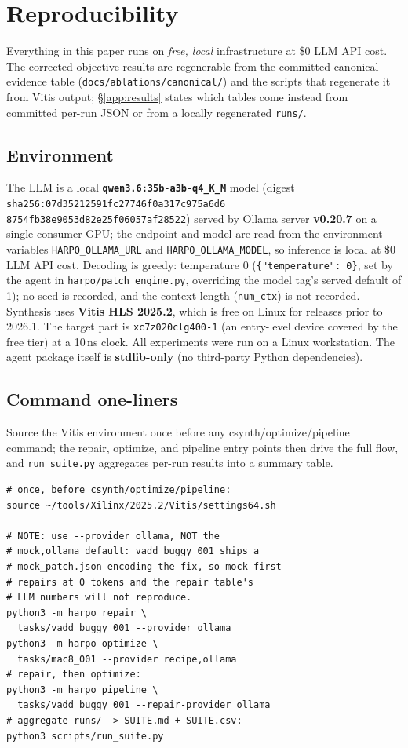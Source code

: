 \section{Reproducibility}\label{app:repro}

Everything in this paper runs on \emph{free, local} infrastructure at \$0 LLM
API cost. The corrected-objective results are regenerable from the committed
canonical evidence table (\texttt{docs/ablations/canonical/}) and the scripts
that regenerate it from Vitis output; \S\ref{app:results} states which tables
come instead from committed per-run JSON or from a locally regenerated
\texttt{runs/}.

\subsection{Environment}

The LLM is a local \textbf{\texttt{qwen3.6:35b-a3b-q4\_K\_M}} model (digest
\texttt{sha256:07d35212591fc277\allowbreak46f0a317c975a6d6\allowbreak%
8754fb38e9053d82\allowbreak e25f06057af28522})
served by Ollama server \textbf{v0.20.7} on a single consumer GPU; the
endpoint and model are read from the environment variables
\texttt{HARPO\_OLLAMA\_URL} and \texttt{HARPO\_OLLAMA\_MODEL}, so inference is
local at \$0 LLM API cost. Decoding is greedy: temperature 0
(\texttt{\{"temperature": 0\}}, set by the agent in
\texttt{harpo/patch\_engine.py}, overriding the model tag's served default of
1); no seed is recorded, and the context length (\texttt{num\_ctx}) is not
recorded. Synthesis uses \textbf{Vitis HLS 2025.2}, which is free on
Linux for releases prior to 2026.1. The target part is
\texttt{xc7z020clg400-1} (an entry-level device covered by the free tier) at a
10\,ns clock. All experiments were run on a Linux workstation. The agent package
itself is \textbf{stdlib-only} (no third-party Python dependencies).

\subsection{Command one-liners}

Source the Vitis environment once before any csynth/optimize/pipeline command;
the repair, optimize, and pipeline entry points then drive the full flow, and
\texttt{run\_suite.py} aggregates per-run results into a summary table.

{\footnotesize
\begin{verbatim}
# once, before csynth/optimize/pipeline:
source ~/tools/Xilinx/2025.2/Vitis/settings64.sh

# NOTE: use --provider ollama, NOT the
# mock,ollama default: vadd_buggy_001 ships a
# mock_patch.json encoding the fix, so mock-first
# repairs at 0 tokens and the repair table's
# LLM numbers will not reproduce.
python3 -m harpo repair \
  tasks/vadd_buggy_001 --provider ollama
python3 -m harpo optimize \
  tasks/mac8_001 --provider recipe,ollama
# repair, then optimize:
python3 -m harpo pipeline \
  tasks/vadd_buggy_001 --repair-provider ollama
# aggregate runs/ -> SUITE.md + SUITE.csv:
python3 scripts/run_suite.py
\end{verbatim}}

